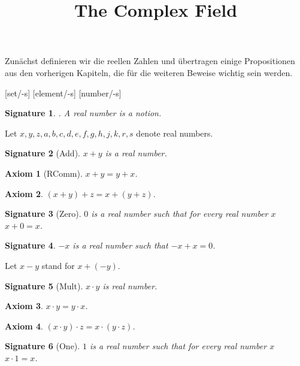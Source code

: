 \documentclass{article}
\newenvironment{forthel}{\begin{leftbar}}{\end{leftbar}}
\newtheorem{axiom}{Axiom}
\newtheorem{signature}{Signature}
\begin{document}
\title{The Complex Field}

\maketitle

Zunächst definieren wir die reellen Zahlen und übertragen einige Propositionen aus den vorherigen Kapiteln, die für die weiteren Beweise wichtig sein werden.

\begin{forthel}

[set/-s] [element/-s] [number/-s]
\begin{signature}. A real number is a notion.

\end{signature}


Let $x,y,z,a,b,c,d,e,f,g,h,j,k,r,s$ denote real numbers.



\begin{signature}[Add] $x + y$ is a real number.

\end{signature}
\begin{axiom}[RComm]$x+y = y+x$.

\end{axiom}
\begin{axiom} $(x+y)+z = x+(y+z)$.

\end{axiom}
\begin{signature}[Zero] $0$ is a real number such that for every real number $x$ $x + 0 = x$.

\end{signature}
\begin{signature} $-x$ is a real number such that $-x + x = 0$.

\end{signature}

Let $x - y$ stand for $x + (-y)$.

\begin{signature}[Mult]$x \cdot y$ is real number.

\end{signature}
\begin{axiom} $x\cdot y = y\cdot x$.

\end{axiom}
\begin{axiom} $(x\cdot y)\cdot z = x\cdot (y\cdot z)$.

\end{axiom}
\begin{signature}[One] $1$ is a real number such that for every real number $x$ $x\cdot 1 = x$.


\end{signature}
\end{forthel}
\end{document}
